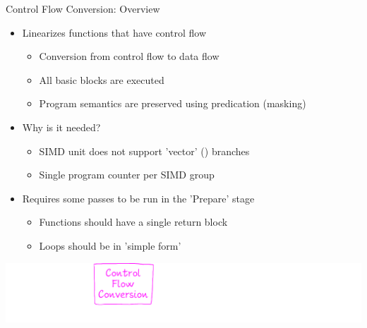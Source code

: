 
\begin{frame}{Control Flow Conversion: Overview}

\begin{itemize}
    \item Linearizes functions that have  control flow
    \begin{itemize}
        \item Conversion from control flow to data flow
        \item All basic blocks are executed
        \item Program semantics are preserved using predication (masking)
    \end{itemize}
    \item Why is it needed?
    \begin{itemize}
        \item SIMD unit does not support 'vector' () branches
        \item Single program counter per SIMD group
    \end{itemize}
    \item Requires some passes to be run in the 'Prepare' stage
    \begin{itemize}
        \item Functions should have a single return block
        \item Loops should be in 'simple form'
    \end{itemize}
\end{itemize}

\vfill
\hspace{1em}\includegraphics[scale=0.55]{images/stages-control-flow.pdf}

\end{frame}


